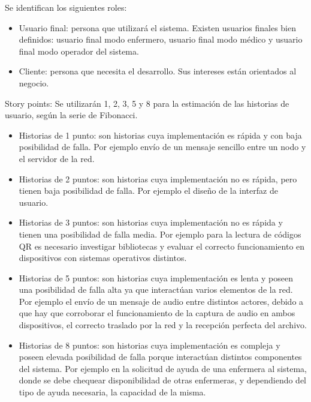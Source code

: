 \documentclass[
11pt, %
]{charter}
\begin{document}


Se identifican los siguientes roles:
\begin{itemize}
	\item Usuario final: persona que utilizará el sistema. Existen  usuarios finales bien definidos: usuario final modo enfermero, usuario final modo médico y usuario final modo operador del sistema.
	\item Cliente: persona que necesita el desarrollo. Sus intereses están orientados al negocio.

\end{itemize}

Story points:
Se utilizarán 1, 2, 3, 5 y 8 para la estimación de las historias de usuario, según la serie de Fibonacci.
\begin{itemize}
	\item Historias de 1 punto: son historias cuya implementación es rápida 	y con baja posibilidad de falla. Por ejemplo envío de un mensaje 			sencillo entre un nodo y el servidor de la red.
	\item Historias de 2 puntos: son historias cuya implementación no es rápida, pero tienen baja posibilidad de falla. Por ejemplo el diseño de la interfaz de usuario.
	\item Historias de 3 puntos: son historias cuya implementación no es rápida y tienen una posibilidad de falla media. Por ejemplo para la lectura de códigos QR es necesario investigar bibliotecas y evaluar el correcto funcionamiento en dispositivos con sistemas operativos distintos.
	\item Historias de 5 puntos: son historias cuya implementación es lenta y poseen una posibilidad de falla alta ya que interactúan varios elementos de la red. Por ejemplo el envío de un mensaje de audio entre distintos actores, debido a que hay que corroborar el funcionamiento de la captura de audio en ambos dispositivos, el correcto traslado por la red y la recepción perfecta del archivo.
	\item Historias de 8 puntos: son historias cuya implementación es compleja y poseen  elevada posibilidad de falla porque interactúan distintos componentes del sistema. Por ejemplo en la solicitud de ayuda de una enfermera al sistema, donde se debe chequear disponibilidad de otras enfermeras, y dependiendo del tipo de ayuda necesaria, la capacidad de la misma.

\end{itemize}
\end{document}
